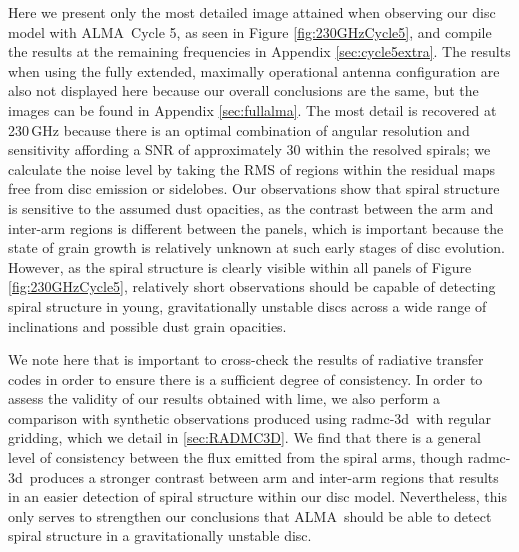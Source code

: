 \documentclass[fleqn,usenatbib]{mnras}
\newcommand{\lime}{{\sc lime}}
\newcommand{\radmc}{{\sc radmc-3d}}
\newcommand{\alma}{ALMA}
\begin{document}
Here we present only the most detailed image attained when observing our disc model with \alma\ Cycle 5, as seen in Figure \ref{fig:230GHzCycle5}, and compile the results at the remaining frequencies in Appendix \ref{sec:cycle5extra}. The results when using the fully extended, maximally operational antenna configuration are also not displayed here because our overall conclusions are the same, but the images can be found in Appendix \ref{sec:fullalma}. The most detail is recovered at 230\,GHz because there is an optimal combination of angular resolution and sensitivity affording a SNR of approximately 30 within the resolved spirals; we calculate the noise level by taking the RMS of regions within the residual maps free from disc emission or sidelobes. Our observations show that spiral structure is sensitive to the assumed dust opacities, as the contrast between the arm and inter-arm regions is different between the panels, which is important because the state of grain growth is relatively unknown at such early stages of disc evolution. However, as the spiral structure is clearly visible within all panels of Figure \ref{fig:230GHzCycle5}, relatively short observations should be capable of detecting spiral structure in young, gravitationally unstable discs across a wide range of inclinations and possible dust grain opacities.

\smallskip

We note here that is important to cross-check the results of radiative transfer codes in order to ensure there is a sufficient degree of consistency. In order to assess the validity of our results obtained with \lime, we also perform a comparison with synthetic observations produced using \radmc\ with regular gridding, which we detail in \autoref{sec:RADMC3D}. We find that there is a general level of consistency between the flux emitted from the spiral arms, though \radmc\ produces a stronger contrast between arm and inter-arm regions that results in an easier detection of spiral structure within our disc model. Nevertheless, this only serves to strengthen our conclusions that \alma\ should be able to detect spiral structure in a gravitationally unstable disc.

\smallskip
\end{document}
